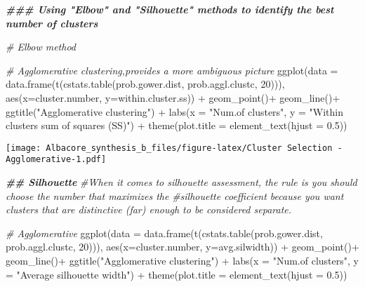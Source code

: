 \documentclass[
]{article}
\newenvironment{Shaded}{\begin{snugshade}}{\end{snugshade}}
\newcommand{\AttributeTok}[1]{\textcolor[rgb]{0.77,0.63,0.00}{#1}}
\newcommand{\CommentTok}[1]{\textcolor[rgb]{0.56,0.35,0.01}{\textit{#1}}}
\newcommand{\DecValTok}[1]{\textcolor[rgb]{0.00,0.00,0.81}{#1}}
\newcommand{\DocumentationTok}[1]{\textcolor[rgb]{0.56,0.35,0.01}{\textbf{\textit{#1}}}}
\newcommand{\FloatTok}[1]{\textcolor[rgb]{0.00,0.00,0.81}{#1}}
\newcommand{\FunctionTok}[1]{\textcolor[rgb]{0.00,0.00,0.00}{#1}}
\newcommand{\NormalTok}[1]{#1}
\newcommand{\SpecialCharTok}[1]{\textcolor[rgb]{0.00,0.00,0.00}{#1}}
\newcommand{\StringTok}[1]{\textcolor[rgb]{0.31,0.60,0.02}{#1}}
\begin{document}
\begin{Shaded}
\begin{Highlighting}[]
\DocumentationTok{\#\#\# Using "Elbow" and "Silhouette" methods to identify the best number of clusters}

\CommentTok{\# Elbow method}

\CommentTok{\# Agglomerative clustering,provides a more ambiguous picture}
\FunctionTok{ggplot}\NormalTok{(}\AttributeTok{data =} \FunctionTok{data.frame}\NormalTok{(}\FunctionTok{t}\NormalTok{(}\FunctionTok{cstats.table}\NormalTok{(prob.gower.dist, prob.aggl.clustc, }\DecValTok{20}\NormalTok{))), }
       \FunctionTok{aes}\NormalTok{(}\AttributeTok{x=}\NormalTok{cluster.number, }\AttributeTok{y=}\NormalTok{within.cluster.ss)) }\SpecialCharTok{+} 
  \FunctionTok{geom\_point}\NormalTok{()}\SpecialCharTok{+}
  \FunctionTok{geom\_line}\NormalTok{()}\SpecialCharTok{+}
  \FunctionTok{ggtitle}\NormalTok{(}\StringTok{"Agglomerative clustering"}\NormalTok{) }\SpecialCharTok{+}
  \FunctionTok{labs}\NormalTok{(}\AttributeTok{x =} \StringTok{"Num.of clusters"}\NormalTok{, }\AttributeTok{y =} \StringTok{"Within clusters sum of squares (SS)"}\NormalTok{) }\SpecialCharTok{+}
  \FunctionTok{theme}\NormalTok{(}\AttributeTok{plot.title =} \FunctionTok{element\_text}\NormalTok{(}\AttributeTok{hjust =} \FloatTok{0.5}\NormalTok{))}
\end{Highlighting}
\end{Shaded}

\texttt{[image: Albacore\_synthesis\_b\_files/figure-latex/Cluster Selection - Agglomerative-1.pdf]}

\begin{Shaded}
\begin{Highlighting}[]
\DocumentationTok{\#\# Silhouette}
\CommentTok{\#When it comes to silhouette assessment, the rule is you should choose the number that maximizes the }
\CommentTok{\#silhouette coefficient because you want clusters that are distinctive (far) enough to be considered separate.}

\CommentTok{\# Agglomerative}
\FunctionTok{ggplot}\NormalTok{(}\AttributeTok{data =} \FunctionTok{data.frame}\NormalTok{(}\FunctionTok{t}\NormalTok{(}\FunctionTok{cstats.table}\NormalTok{(prob.gower.dist, prob.aggl.clustc, }\DecValTok{20}\NormalTok{))), }
       \FunctionTok{aes}\NormalTok{(}\AttributeTok{x=}\NormalTok{cluster.number, }\AttributeTok{y=}\NormalTok{avg.silwidth)) }\SpecialCharTok{+} 
  \FunctionTok{geom\_point}\NormalTok{()}\SpecialCharTok{+}
  \FunctionTok{geom\_line}\NormalTok{()}\SpecialCharTok{+}
  \FunctionTok{ggtitle}\NormalTok{(}\StringTok{"Agglomerative clustering"}\NormalTok{) }\SpecialCharTok{+}
  \FunctionTok{labs}\NormalTok{(}\AttributeTok{x =} \StringTok{"Num.of clusters"}\NormalTok{, }\AttributeTok{y =} \StringTok{"Average silhouette width"}\NormalTok{) }\SpecialCharTok{+}
  \FunctionTok{theme}\NormalTok{(}\AttributeTok{plot.title =} \FunctionTok{element\_text}\NormalTok{(}\AttributeTok{hjust =} \FloatTok{0.5}\NormalTok{))}
\end{Highlighting}
\end{Shaded}
\end{document}
